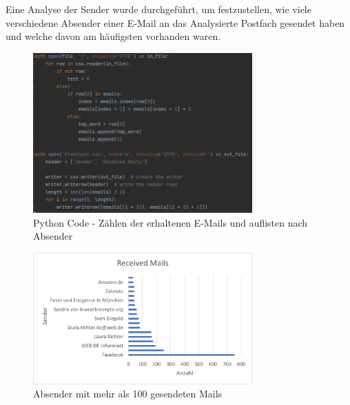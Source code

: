 Eine Analyse der Sender wurde durchgeführt, um festzustellen, wie viele verschiedene Absender einer E-Mail an das Analysierte Postfach gesendet haben und welche davon am häufigsten vorhanden waren.




\begin{figure}
    \centering
    \includegraphics[width=0.75\textwidth]{images/Count_Received_Mails_Count_Sender.PNG}
    \caption{Python Code - Zählen der erhaltenen E-Mails und auflisten nach Absender} 
    \label{fig:countemailssender}
\end{figure}


\begin{figure}
    \centering
    \includegraphics[width=0.75\textwidth]{images/Auswertung_Empfange_Emails.png}
    \caption{Absender mit mehr als 100 gesendeten Mails} 
    \label{fig:receivedemails}
\end{figure}